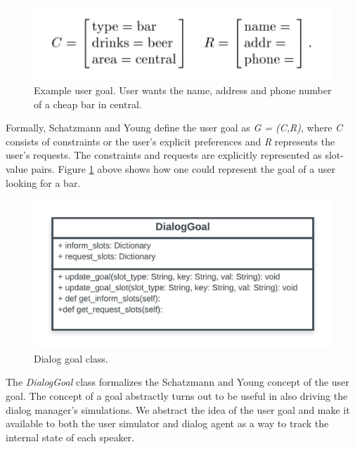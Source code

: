 \begin{figure}[h!]
	\includegraphics[scale=.35]{diagrams/schatzmann_goal_fig.jpeg}
	\caption{Example user goal. User wants the name, address and phone number of a cheap bar in central.  \cite{Schatzmann2009TheHA} }
	\label{fig:goals1}
\end{figure}

Formally, Schatzmann and Young define the user goal as \textit{G = (C,R)}, where \textit{C} consists of constraints or the user's explicit preferences and \textit{R} represents the user's requests. The constraints and requests are explicitly represented as slot-value pairs. Figure \ref{fig:goals1} above shows how one could represent the goal of a user looking for a bar. 

\begin{figure}[h!]
	\centering
	\includegraphics[scale=1]{diagrams/dialog_goal_class.jpeg}
	\caption{Dialog goal class.  }
	\label{fig:goal_class}
\end{figure}

The \textit{DialogGoal} class formalizes the Schatzmann and Young concept of the user goal. The concept of a goal abstractly turns out to be useful in also driving the dialog manager's simulations. We abstract the idea of the user goal and make it available to both the user simulator and dialog agent as a way to track the internal state of each speaker. 

